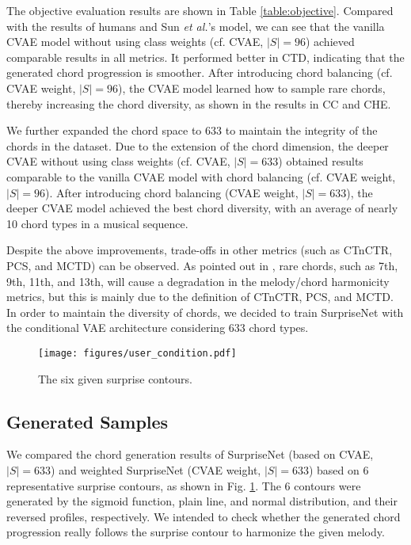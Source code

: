 \documentclass{article}
\begin{document}
The objective evaluation results are shown in Table \ref{table:objective}. Compared with the results of humans and Sun \textit{et al.}'s model, we can see that the vanilla CVAE model without using class weights (cf. CVAE, $|S|=96$) achieved comparable results in all metrics. It performed better in CTD, indicating that the generated chord progression is smoother. After introducing chord balancing (cf. CVAE weight, $|S|=96$), the CVAE model learned how to sample rare chords, thereby increasing the chord diversity, as shown in the results in CC and CHE.

We further expanded the chord space to 633 to maintain the integrity of the chords in the dataset. Due to the extension of the chord dimension, the deeper CVAE without using class weights (cf. CVAE, $|S|=633$) obtained results comparable to the vanilla CVAE model with chord balancing (cf. CVAE weight, $|S|=96$). After introducing chord balancing (CVAE weight, $|S|=633$), the deeper CVAE model achieved the best chord diversity, with an average of nearly 10 chord types in a musical sequence.

Despite the above improvements, trade-offs in other metrics (such as CTnCTR, PCS, and MCTD) can be observed. As pointed out in \cite{Sun2020}, rare chords, such as 7th, 9th, 11th, and 13th, will cause a degradation in the melody/chord harmonicity metrics, but this is mainly due to the definition of CTnCTR, PCS, and MCTD. In order to maintain the diversity of chords, we decided to train SurpriseNet with the conditional VAE architecture considering 633 chord types.

\begin{figure}[t]
\begin{center}
\texttt{[image: figures/user\_condition.pdf]}
\end{center}
\vspace{-20pt}
\caption{The six given surprise contours.}
\label{fig:uc}
\vspace{-10pt}
\end{figure}

\subsection{Generated Samples}

We compared the chord generation results of SurpriseNet (based on CVAE, $|S|=633$) and weighted SurpriseNet (CVAE weight, $|S|=633$) based on 6 representative surprise contours, as shown in Fig. \ref{fig:uc}. The 6 contours were generated by the sigmoid function, plain line, and normal distribution, and their reversed profiles, respectively. We intended to check whether the generated chord progression really follows the surprise contour to harmonize the given melody.
\end{document}
